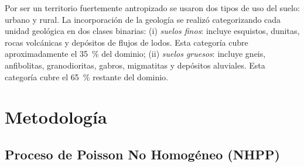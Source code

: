 \documentclass[10pt, twocolumn, letterpaper]{article}
\begin{document}
\begin{table}[htbp]
  \centering
  \caption{Estadísticas descriptivas de las covariables topográficas
           estandarizadas en las \num{2504} localizaciones de movimientos en
           masa (MDE a \SI{2}{m}).}
  \label{tab:covstats}
\end{table}

Por ser un territorio fuertemente antropizado se usaron dos tipos de uso del
suelo: urbano y rural. La incorporación de la geología se realizó categorizando
cada unidad geológica en dos clases binarias: (i) \textit{suelos finos}: incluye esquistos, dunitas, rocas volcánicas y
  depósitos de flujos de lodos. Esta categoría cubre aproximadamente el
  \SI{35}{\percent} del dominio; (ii) \textit{suelos gruesos}: incluye gneis, anfibolitas, granodioritas,
  gabros, migmatitas y depósitos aluviales. Esta categoría cubre el
  \SI{65}{\percent} restante del dominio.

\section{Metodología}
\label{sec:methods}

\subsection{Proceso de Poisson No Homogéneo (NHPP)}
\label{sec:ipp}
\end{document}

